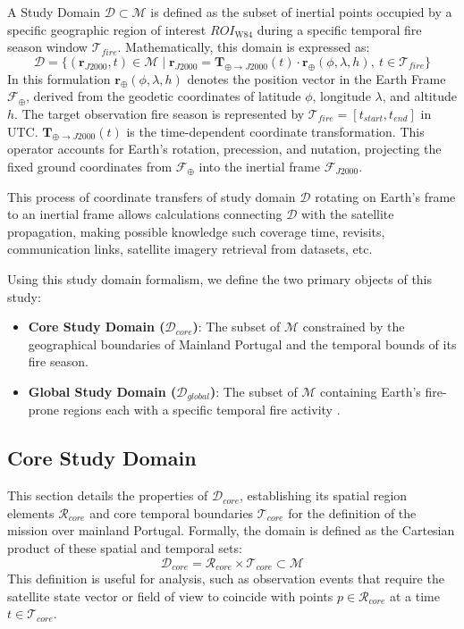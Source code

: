 A Study Domain $\mathcal{D} \subset \mathcal{M}$ is defined as the subset of inertial points occupied by a specific geographic region of interest $ROI_{\text{W84}}$ during a specific temporal fire season window $\mathcal{T}_{fire}$. Mathematically, this domain is expressed as:
\begin{equation}
    \mathcal{D} = \{ (\mathbf{r}_{J2000}, t) \in \mathcal{M} \mid \mathbf{r}_{J2000} = \mathbf{T}_{\oplus \to J2000}(t) \cdot \mathbf{r}_{\oplus}(\phi, \lambda, h), \ t \in \mathcal{T}_{fire} \}
\end{equation}
In this formulation  $\mathbf{r}_{\oplus}(\phi, \lambda, h)$ denotes the position vector in the Earth Frame $\mathcal{F}_{\oplus}$, derived from the geodetic coordinates of latitude $\phi$, longitude $\lambda$, and altitude $h$. The target observation fire season is represented by $\mathcal{T}_{fire} = [t_{start}, t_{end}]$ in UTC. $\mathbf{T}_{\oplus \to J2000}(t)$ is the time-dependent coordinate transformation. This operator accounts for Earth’s rotation, precession, and nutation, projecting the fixed ground coordinates from $\mathcal{F}_{\oplus}$ into the inertial frame $\mathcal{F}_{J2000}$.  

This process of coordinate transfers of study domain $\mathcal{D}$ rotating on Earth's frame to an inertial frame allows calculations connecting $\mathcal{D}$ with the satellite propagation, making possible knowledge such coverage time, revisits, communication links, satellite imagery retrieval from datasets, etc.

Using this study domain formalism, we define the two primary objects of this study:
\begin{itemize}
    \item \textbf{Core Study Domain ($\mathcal{D}_{core}$)}: The subset of $\mathcal{M}$ constrained by the geographical boundaries of Mainland Portugal and the temporal bounds of its fire season.
    \item \textbf{Global Study Domain ($\mathcal{D}_{global}$)}: The subset of  $\mathcal{M}$  containing Earth's fire-prone regions each with a specific temporal fire activity .
\end{itemize}

\subsection{Core Study Domain}

This section details the properties of $\mathcal{D}_{core}$, establishing its spatial region elements $\mathcal{R}_{core}$ and core temporal boundaries $\mathcal{T}_{core}$ for the definition of the mission over mainland Portugal. Formally, the domain is defined as the Cartesian product of these spatial and temporal sets:
\begin{equation}
    \mathcal{D}_{core} = \mathcal{R}_{core} \times \mathcal{T}_{core} \subset \mathcal{M}
\end{equation}
This definition is useful for analysis, such as observation events that require the satellite state vector or field of view to coincide with points $p \in \mathcal{R}_{core}$ at a time $t \in \mathcal{T}_{core}$. 

